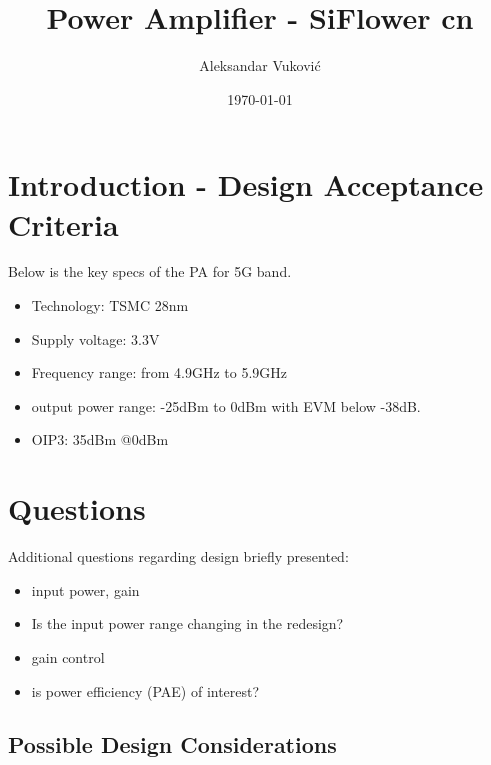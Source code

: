\documentclass{article}
\title{Power Amplifier - SiFlower cn} %
\author{Aleksandar Vuković} %
\date{\today} %
\begin{document}
\maketitle %


\section*{Introduction - Design Acceptance Criteria} %

Below is the key specs of the PA for 5G band. 

\begin{itemize}
	\item Technology: TSMC 28nm 
	\item Supply voltage: 3.3V 
	\item Frequency range: from 4.9GHz to 5.9GHz 
	\item output power range: -25dBm to 0dBm with EVM below -38dB. 
	\item OIP3: 35dBm @0dBm %
\end{itemize}


\section{Questions}

Additional questions regarding design briefly presented:

\begin{itemize}
	\item input power, gain %
	\item Is the input power range changing in the redesign? 
	\item gain control %
	\item is power efficiency (PAE) of interest?
\end{itemize}

\subsection{Possible Design Considerations}
\end{document}
